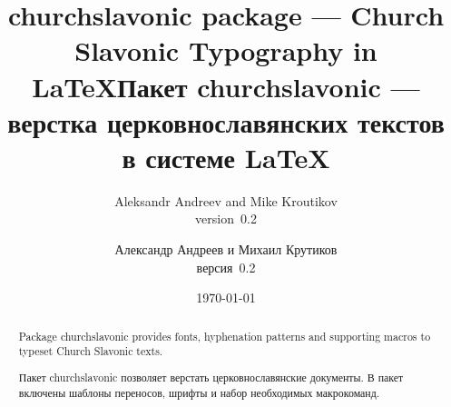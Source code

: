\newfontfamily{}
\newfontfamily{}
\newfontfamily{}
\newfontfamily{}

\usepackage{churchslavonic}
\usepackage{hyperref}
\usepackage{xltxtra}
\usepackage{doc}
\usepackage{lettrine}

\def\pkg#1{\textsf{#1}}
\def\cs#1{\texttt{\textbackslash #1}}
%
%
\makeatletter
\def\cu@lettrine{\lettrine[lines=3,findent=0pt,nindent=0pt]}
\def\cuLettrine{\cu@tokenizeletter\cu@lettrine}
\renewcommand{\LettrineFontHook}{\cuKinovarColor}
\makeatother



\begin{EN}
\title{\pkg{churchslavonic} package --- Church Slavonic Typography in \LaTeX}
\author{Aleksandr Andreev and Mike Kroutikov\\version~0.2}
\end{EN}

\begin{RU}
\title{Пакет \pkg{churchslavonic} --- верстка церковнославянских текстов в системе \LaTeX}
\author{Александр Андреев и Михаил Крутиков\\версия~0.2}
\end{RU}

\date{\today}
\maketitle

\begin{EN}
\begin{abstract}
Package \pkg{churchslavonic} provides fonts, hyphenation patterns and supporting macros to typeset
Church Slavonic texts.
\end{abstract}
\end{EN}

\begin{RU}
\begin{abstract}
Пакет \pkg{churchslavonic} позволяет верстать церковнославянские документы. В пакет включены шаблоны переносов,
шрифты и набор необходимых макрокоманд.
\end{abstract}
\end{RU}

